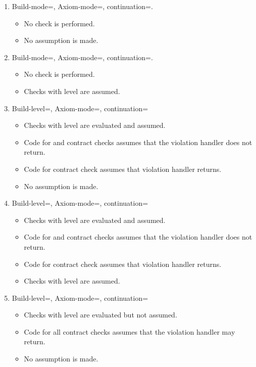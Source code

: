 \begin{enumerate}

\item Build-mode=, Axiom-mode=, continuation=.
\begin{itemize}
  \item No check is performed.
  \item No assumption is made.
\end{itemize}

\item Build-mode=, Axiom-mode=, continuation=.
\begin{itemize}
  \item No check is performed.
  \item Checks with  level are assumed.
\end{itemize}

\item Build-level=, Axiom-mode=, continuation=
\begin{itemize}
  \item Checks with  level are evaluated and assumed.
  \item Code for  and  contract checks 
	  assumes that the violation handler does not return.
  \item Code for  contract check assumes that violation handler
	  returns.
  \item No assumption is made.
\end{itemize}

\item Build-level=, Axiom-mode=, continuation=
\begin{itemize}
  \item Checks with  level are evaluated and assumed.
  \item Code for  and  contract checks 
	  assumes that the violation handler does not return.
  \item Code for  contract check assumes that violation handler
	  returns.
  \item Checks with  level are assumed.
\end{itemize}

\item Build-level=, Axiom-mode=, continuation=
\begin{itemize}
  \item Checks with  level are evaluated but not assumed.
  \item Code for all contract checks assumes that the violation handler may return.
  \item No assumption is made.
\end{itemize}


\end{enumerate}
